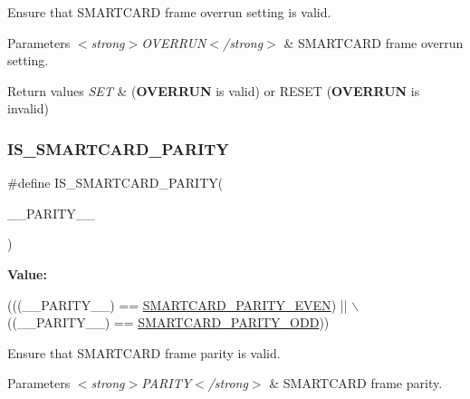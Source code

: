 Ensure that S\+M\+A\+R\+T\+C\+A\+RD frame overrun setting is valid. 


\begin{DoxyParams}{Parameters}
{\em $<$strong$>$\+O\+V\+E\+R\+R\+U\+N$<$/strong$>$} & S\+M\+A\+R\+T\+C\+A\+RD frame overrun setting. \\
\hline
\end{DoxyParams}

\begin{DoxyRetVals}{Return values}
{\em S\+ET} & ({\bfseries O\+V\+E\+R\+R\+UN} is valid) or R\+E\+S\+ET ({\bfseries O\+V\+E\+R\+R\+UN} is invalid) \\
\hline
\end{DoxyRetVals}
\mbox{\label{group___s_m_a_r_t_c_a_r_d___private___macros_ga5c10d88b00d317fd6dec54a66ef87b37}} 
\subsubsection{\texorpdfstring{I\+S\+\_\+\+S\+M\+A\+R\+T\+C\+A\+R\+D\+\_\+\+P\+A\+R\+I\+TY}{IS\_SMARTCARD\_PARITY}}
{\footnotesize\ttfamily \#define I\+S\+\_\+\+S\+M\+A\+R\+T\+C\+A\+R\+D\+\_\+\+P\+A\+R\+I\+TY(\begin{DoxyParamCaption}\item[{}]{\+\_\+\+\_\+\+P\+A\+R\+I\+T\+Y\+\_\+\+\_\+ }\end{DoxyParamCaption})}

{\bfseries Value\+:}
\begin{DoxyCode}
(((\_\_PARITY\_\_) == \hyperlink{group___s_m_a_r_t_c_a_r_d___parity_ga94ae871b29c18b59dab9a045443d11c8}{SMARTCARD\_PARITY\_EVEN}) || \(\backslash\)
                                         ((\_\_PARITY\_\_) == \hyperlink{group___s_m_a_r_t_c_a_r_d___parity_gaef2239030beeb07577e43965b013f65d}{SMARTCARD\_PARITY\_ODD}))
\end{DoxyCode}


Ensure that S\+M\+A\+R\+T\+C\+A\+RD frame parity is valid. 


\begin{DoxyParams}{Parameters}
{\em $<$strong$>$\+P\+A\+R\+I\+T\+Y$<$/strong$>$} & S\+M\+A\+R\+T\+C\+A\+RD frame parity. \\
\hline
\end{DoxyParams}

